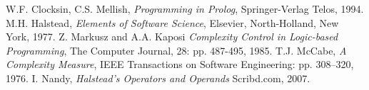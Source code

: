 \documentclass[11pt,a4paper,twoside]{article}
\begin{document}
\newpage

\begin{thebibliography}{halstead}
  W.F. Clocksin, C.S. Mellish, 
  \emph{Programming in Prolog}, 
  Springer-Verlag Telos, 1994.
  M.H. Halstead, 
  \emph{Elements of Software Science}, 
  Elsevier, North-Holland, New York, 1977.
  Z. Markusz and A.A. Kaposi 
  \emph{Complexity Control in Logic-based Programming},
  The Computer Journal, 28: pp. 487-495, 1985.
  T.J. McCabe, 
  \emph{A Complexity Measure}, 
  IEEE Transactions on Software Engineering: pp. 308–320, 1976.
  I. Nandy, 
  \emph{Halstead's Operators and Operands}
  Scribd.com, 2007.
\end{thebibliography}
\end{document}
